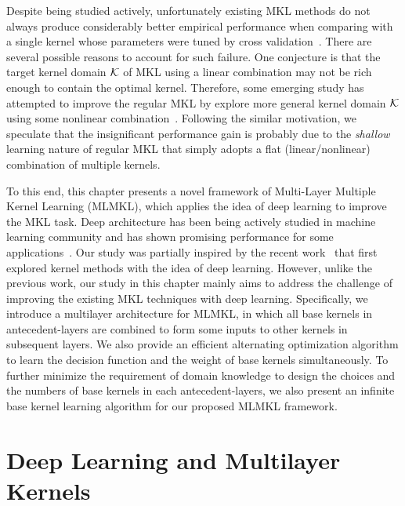 Despite being studied actively, unfortunately existing MKL methods do not always produce considerably better empirical performance when comparing with a single kernel whose parameters were tuned by cross validation~\cite{tr/GehlerN08}. There are several possible reasons to account for such failure. One conjecture is that the target kernel domain ${\mathcal K}$ of MKL using a linear combination may not be rich enough to contain the optimal kernel. Therefore, some emerging study has attempted to improve the regular MKL by explore more general kernel domain ${\mathcal K}$ using some nonlinear combination~\cite{icml/VarmaB09}. Following the similar motivation, we
speculate that the insignificant performance gain is probably due to the {\it shallow} learning nature of regular MKL that simply adopts a flat (linear/nonlinear) combination of multiple kernels.

To this end, this chapter presents a novel framework of Multi-Layer Multiple Kernel Learning (MLMKL), which applies the idea of deep learning to improve the MKL task. Deep architecture has been being actively studied in machine learning community and has shown promising performance for some applications~\cite{neco/HintonOT06,science/HintonS06,icml/LarochelleECBB07,ftml/Bengio09}.
Our study was partially inspired by the recent work~\cite{nips/ChoS09} that first explored kernel methods with the idea of deep learning. However, unlike the previous work, our study in this chapter mainly aims to address the challenge of improving the existing MKL techniques with deep learning. Specifically, we introduce a multilayer architecture for MLMKL, in
which all base kernels in antecedent-layers are combined to form some inputs to other kernels in subsequent layers. We also provide an efficient alternating optimization algorithm to learn the decision function and the weight of base kernels simultaneously. To further minimize the requirement of domain knowledge to design the choices and the numbers of base kernels in each antecedent-layers, we also present an infinite base kernel learning algorithm for our proposed MLMKL framework.


\section{Deep Learning and Multilayer Kernels}

